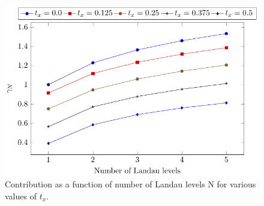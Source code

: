 \documentclass[%
 reprint,
 amsmath,amssymb,
 aps,
]{revtex4-2}
\begin{document}
\begin{figure}[t]
  \centering
  \includegraphics[width=.7\columnwidth]{figures/contribtx}
  \caption{\label{fig:contribtx}Contribution as a function of number of Landau levels N for various values of \(t_x\).}
\end{figure}


\nocite{*}

\end{document}
